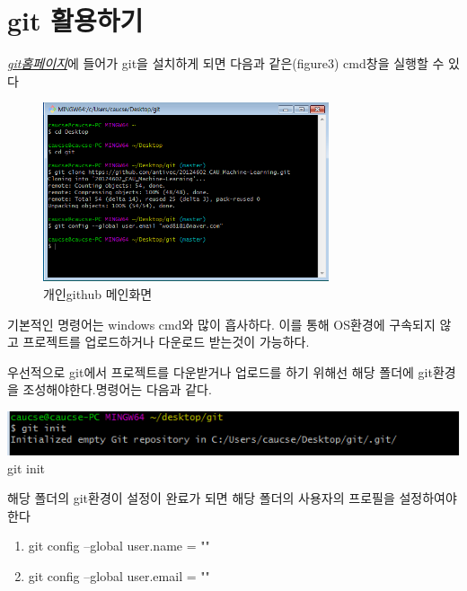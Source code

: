 \documentclass[12pt]{article}
\begin{document}
\section{git 활용하기}
	\textit{\href{https://git-scm.com/download/win}{git홈페이지}}에 들어가 git을 설치하게 되면 다음과 같은(figure3) cmd창을 실행할 수 있다
	\begin{figure}		
		\includegraphics[width=0.75\textwidth]{git_cmd}
		\caption{개인github 메인화면}
	\end{figure}

	
	기본적인 명령어는 windows cmd와 많이 흡사하다.
	이를 통해 OS환경에 구속되지 않고 프로젝트를 업로드하거나 다운로드 받는것이 가능하다.
	
	우선적으로 git에서 프로젝트를 다운받거나 업로드를 하기 위해선 해당 폴더에 git환경을 조성해야한다.명령어는 다음과 같다.
	\begin{mdframed}[
		linecolor= black,
		roundcorner=10pt,
		innertopmargin =\topskip,
		leftmargin = 0.5cm,
		rightmargin = 0.5cm,
		frametitleaboveskip = 0.5pt,
		frametitlerulewidth = 0.5pt,
		frametitlealignment =,
		frametitlebackgroundcolor = yellow,			
		frametitle = {git환경 설정하기}	]
		\includegraphics[width=\textwidth]{git_init}
		git init		
	\end{mdframed}
	해당 폴더의 git환경이 설정이 완료가 되면 해당 폴더의 사용자의 프로필을 설정하여야 한다
	\begin{mdframed}[
		linecolor= black,
		roundcorner=10pt,
		innertopmargin =\topskip,
		leftmargin = 0.5cm,
		rightmargin = 0.5cm,
		frametitleaboveskip = 0.5pt,
		frametitlerulewidth = 0.5pt,
		frametitlealignment =,
		frametitlebackgroundcolor = yellow,			
		frametitle = {git프로필 설정하기}	]
		\begin{enumerate}
			\item git config --global user.name = ""		
			\item git config --global user.email = ""	

		\end{enumerate}  		
	\end{mdframed}
\end{document}
